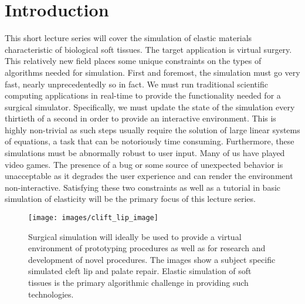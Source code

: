 \documentclass[article]{pcms-l}
\begin{document}
\section*{Introduction}
This short lecture series will cover the simulation of elastic materials characteristic of biological soft tissues. The target application is virtual surgery. This relatively new field places some unique constraints on the types of algorithms needed for simulation. First and foremost, the simulation must go very fast, nearly unprecedentedly so in fact. We must run traditional scientific computing applications in real-time to provide the functionality needed for a surgical simulator. Specifically, we must update the state of the simulation every thirtieth of a second in order to provide an interactive environment. This is highly non-trivial as such steps usually require the solution of large linear systems of equations, a task that can be notoriously time consuming. Furthermore, these simulations must be abnormally robust to user input. Many of us have played video games. The presence of a bug or some source of unexpected behavior is unacceptable as it degrades the user experience and can render the environment non-interactive. Satisfying these two constraints as well as a tutorial in basic simulation of elasticity will be the primary focus of this lecture series.

\begin{figure}
\texttt{[image: images/clift\_lip\_image]}
\caption{Surgical simulation will ideally be used to provide a virtual environment of prototyping procedures as well as for research and development of novel procedures. The images show a subject specific simulated cleft lip and palate repair. Elastic simulation of soft tissues is the primary algorithmic challenge in providing such technologies.}
\label{cleft}
\end{figure}
\end{document}
